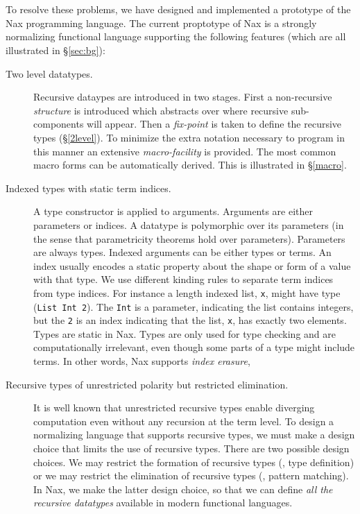 \paragraph{} ~\\

To resolve these problems, we have designed and implemented a prototype of
the Nax programming language. The current proptotype of Nax is a
strongly normalizing functional language supporting the following features
(which are all illustrated in \S\ref{sec:bg}):
\begin{description}

\item[Two level datatypes.]
Recursive dataypes are introduced in two stages. First a non-recursive
{\em structure} is introduced which abstracts over where recursive
sub-components will appear. Then a {\em fix-point} is taken to define
the recursive types (\S \ref{2level}). To minimize the extra notation necessary to program
in this manner an extensive {\em macro-facility} is provided. The most common
macro forms can be automatically derived. This is illustrated in \S\ref{macro}.

\item[Indexed types with static term indices.]
A type constructor is applied to arguments. Arguments
are either parameters or indices. A datatype is polymorphic over
its parameters (in the sense that parametricity theorems hold over parameters).
Parameters are always types.
Indexed arguments can be either types or terms. An index usually
encodes a static property about the shape or form of a value with
that type. We use different kinding rules to separate
term indices from type indices. For instance a length indexed list, \verb+x+,
might have type (\verb+List Int 2+). The \verb+Int+ is a parameter, indicating
the list contains integers, but the \verb+2+ is an index indicating
that the list, \verb+x+, has exactly two elements.
Types are static in Nax. Types are only used for type checking
and are computationally irrelevant, even though some parts of a type might include terms.
In other words, Nax supports \emph{index erasure},

\item[Recursive types of unrestricted polarity but restricted elimination.]
It is well known that unrestricted recursive types enable diverging computation
even without any recursion at the term level. To design a normalizing language
that supports recursive types, we must make a design choice that limits
the use of recursive types. There are two possible
design choices. We may restrict the formation of recursive types
(\ie, type definition) or we may restrict the elimination of recursive types
(\ie, pattern matching). In Nax, we make the latter design choice, so that we can
define \emph{all the recursive datatypes} available in modern functional languages.


\end{description}
